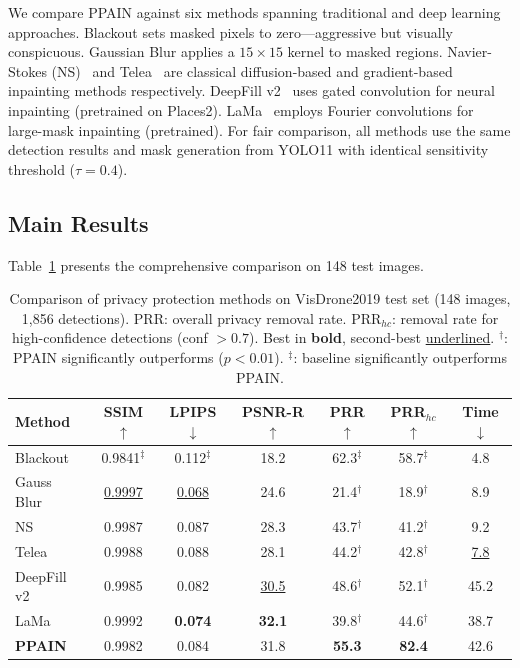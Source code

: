 \documentclass[preprint,12pt]{elsarticle}
\begin{document}
We compare PPAIN against six methods spanning traditional and deep learning approaches. Blackout sets masked pixels to zero---aggressive but visually conspicuous. Gaussian Blur applies a $15 \times 15$ kernel to masked regions. Navier-Stokes (NS)~\cite{criminisi2004region} and Telea~\cite{telea2004imageinpainting} are classical diffusion-based and gradient-based inpainting methods respectively. DeepFill v2~\cite{yu2018free} uses gated convolution for neural inpainting (pretrained on Places2). LaMa~\cite{suvorov2022lama} employs Fourier convolutions for large-mask inpainting (pretrained). For fair comparison, all methods use the same detection results and mask generation from YOLO11 with identical sensitivity threshold ($\tau = 0.4$).

\subsection{Main Results}

Table~\ref{tab:main} presents the comprehensive comparison on 148 test images.

\begin{table}[t]
\centering
\small
\caption{Comparison of privacy protection methods on VisDrone2019 test set (148 images, 1,856 detections). PRR: overall privacy removal rate. PRR$_{hc}$: removal rate for high-confidence detections (conf $>0.7$). Best in \textbf{bold}, second-best \underline{underlined}. $^\dagger$: PPAIN significantly outperforms ($p < 0.01$). $^\ddagger$: baseline significantly outperforms PPAIN.}
\label{tab:main}
\begin{tabular}{@{}lcccccc@{}}
\toprule
\textbf{Method} & \textbf{SSIM}$\uparrow$ & \textbf{LPIPS}$\downarrow$ & \textbf{PSNR-R}$\uparrow$ & \textbf{PRR}$\uparrow$ & \textbf{PRR$_{hc}$}$\uparrow$ & \textbf{Time}$\downarrow$ \\
\midrule
Blackout & 0.9841$^\ddagger$ & 0.112$^\ddagger$ & 18.2 & 62.3$^\ddagger$ & 58.7$^\ddagger$ & 4.8 \\
Gauss Blur & \underline{0.9997} & \underline{0.068} & 24.6 & 21.4$^\dagger$ & 18.9$^\dagger$ & 8.9 \\
NS & 0.9987 & 0.087 & 28.3 & 43.7$^\dagger$ & 41.2$^\dagger$ & 9.2 \\
Telea & 0.9988 & 0.088 & 28.1 & 44.2$^\dagger$ & 42.8$^\dagger$ & \underline{7.8} \\
DeepFill v2 & 0.9985 & 0.082 & \underline{30.5} & 48.6$^\dagger$ & 52.1$^\dagger$ & 45.2 \\
LaMa & 0.9992 & \textbf{0.074} & \textbf{32.1} & 39.8$^\dagger$ & 44.6$^\dagger$ & 38.7 \\
\midrule
\textbf{PPAIN} & 0.9982 & 0.084 & 31.8 & \textbf{55.3} & \textbf{82.4} & 42.6 \\
\bottomrule
\end{tabular}
\end{table}
\end{document}
